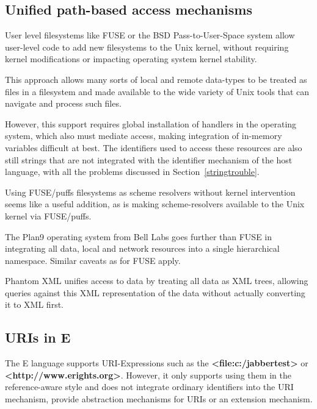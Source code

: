 \documentclass[preprint,authoryear]{acm_proc_article-sp}
\begin{document}
\subsection{Unified path-based access mechanisms}


User level filesystems like FUSE\cite{fuse} or the BSD Pass-to-User-Space\cite{puffs} 
system allow
user-level code to add new filesystems to the Unix kernel, without requiring
kernel modifications or impacting operating system kernel stability.

This approach allows many sorts of local and remote data-types to be 
treated as files in a filesystem and made available to the wide variety
of Unix tools that can navigate and process such files.  

However, this support requires global installation of handlers in the operating
system, which also must mediate access, making integration of in-memory 
variables difficult at best.  The identifiers used to access these resources
are also still strings that are not integrated with the identifier mechanism of
the host language, with all the problems discussed in Section~\ref{stringtrouble}.

Using FUSE/puffs filesystems as scheme resolvers without kernel intervention seems
like a useful addition, as is making scheme-resolvers available to the Unix kernel
via FUSE/puffs.

The Plan9\cite{plan9names}\cite{plan9network} operating system from Bell Labs goes further than FUSE in integrating
all data, local and network resources into a single hierarchical namespace.  Similar
caveats as for FUSE apply.

Phantom XML\cite{phantomxml} unifies access to data by treating all data as
XML trees, allowing queries against this XML representation of the data without
actually converting it to XML first.  




\subsection{URIs in E}

The E language\cite{MillerRobustComposition}  supports URI-Expressions such as
the  {\bf <file:c:/jabbertest>} or {\bf <http://www.erights.org>}.  However,
it only supports using them in the reference-aware style and does not integrate 
ordinary identifiers into the URI mechanism, provide abstraction mechanisms
for URIs or an extension mechanism. 
\end{document}
